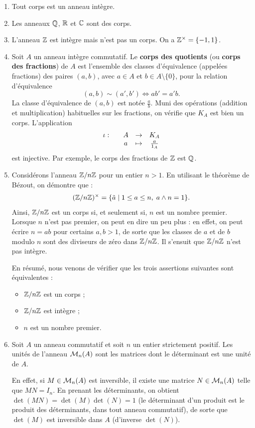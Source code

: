 \documentclass[]{report}
\begin{document}
\begin{ex}{}{}
    \begin{enumerate}
        \item Tout corps est un anneau intègre.
        \item Les anneaux $\mathbb{Q}$, $\mathbb{R}$ et $\mathbb{C}$ sont des corps.
        \item L'anneau $\mathbb{Z}$ est intègre mais n'est pas un corps. On a $\mathbb{Z}^\times = \{-1, 1\}$.
        \item Soit $A$ un anneau intègre commutatif. Le \textbf{corps des quotients} (ou \textbf{corps des fractions}) de $A$ est l'ensemble des classes d'équivalence (appelées fractions) des paires $(a, b)$, avec $a \in A$ et $b \in A \setminus \{0\}$, pour la relation d'équivalence
        \[(a, b) \sim (a', b') \iff ab' = a'b.\]
        La classe d'équivalence de $(a, b)$ est notée $\frac{a}{b}$. Muni des opérations (addition et multiplication) habituelles sur les fractions, on vérifie que $K_A$ est bien un corps. L'application
        \[\begin{array}{ccccc} \iota : & & A & \to & K_A \\ & & a & \mapsto & \frac{a}{1_A} \end{array}\]
        est injective. Par exemple, le corps des fractions de $\mathbb{Z}$ est $\mathbb{Q}$.
        \item Considérons l'anneau $\mathbb{Z}/n\mathbb{Z}$ pour un entier $n > 1$. En utilisant le théorème de Bézout, on démontre que :
        \[(\mathbb{Z}/n\mathbb{Z})^\times = \{\tilde{a} \mid 1 \le a \le n, \; a \wedge n = 1\}.\]
        Ainsi, $\mathbb{Z}/n\mathbb{Z}$ est un corps si, et seulement si, $n$ est un nombre premier. Lorsque $n$ n'est pas premier, on peut en dire un peu plus : en effet, on peut écrire $n = ab$ pour certains $a, b > 1$, de sorte que les classes de $a$ et de $b$ modulo $n$ sont des diviseurs de zéro dans $\mathbb{Z}/n\mathbb{Z}$. Il s'ensuit que $\mathbb{Z}/n\mathbb{Z}$ n'est pas intègre.

        En résumé, nous venons de vérifier que les trois assertions suivantes sont équivalentes :
        \begin{itemize}
            \item[a.] $\mathbb{Z}/n\mathbb{Z}$ est un corps ;
            \item[b.] $\mathbb{Z}/n\mathbb{Z}$ est intègre ;
            \item[c.] $n$ est un nombre premier.
        \end{itemize}
        \item Soit $A$ un anneau commutatif et soit $n$ un entier strictement positif. Les unités de l'anneau $\mathcal{M}_n(A)$ sont les matrices dont le déterminant est une unité de $A$.

        En effet, si $M \in \mathcal{M}_n(A)$ est inversible, il existe une matrice $N \in \mathcal{M}_n(A)$ telle que $MN = I_n$. En prenant les déterminants, on obtient $\det(MN) = \det(M)\det(N) = 1$ (le déterminant d'un produit est le produit des déterminants, dans tout anneau commutatif), de sorte que $\det(M)$ est inversible dans $A$ (d'inverse $\det(N)$).


\end{enumerate}
\end{ex}
\end{document}
